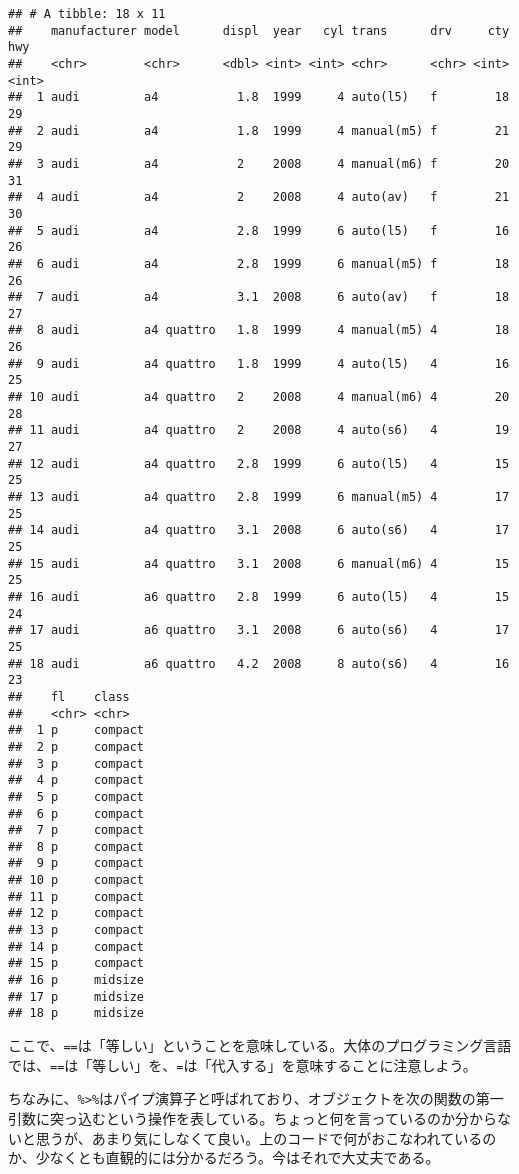 \documentclass[]{book}
\begin{document}
\begin{verbatim}
## # A tibble: 18 x 11
##    manufacturer model      displ  year   cyl trans      drv     cty   hwy
##    <chr>        <chr>      <dbl> <int> <int> <chr>      <chr> <int> <int>
##  1 audi         a4           1.8  1999     4 auto(l5)   f        18    29
##  2 audi         a4           1.8  1999     4 manual(m5) f        21    29
##  3 audi         a4           2    2008     4 manual(m6) f        20    31
##  4 audi         a4           2    2008     4 auto(av)   f        21    30
##  5 audi         a4           2.8  1999     6 auto(l5)   f        16    26
##  6 audi         a4           2.8  1999     6 manual(m5) f        18    26
##  7 audi         a4           3.1  2008     6 auto(av)   f        18    27
##  8 audi         a4 quattro   1.8  1999     4 manual(m5) 4        18    26
##  9 audi         a4 quattro   1.8  1999     4 auto(l5)   4        16    25
## 10 audi         a4 quattro   2    2008     4 manual(m6) 4        20    28
## 11 audi         a4 quattro   2    2008     4 auto(s6)   4        19    27
## 12 audi         a4 quattro   2.8  1999     6 auto(l5)   4        15    25
## 13 audi         a4 quattro   2.8  1999     6 manual(m5) 4        17    25
## 14 audi         a4 quattro   3.1  2008     6 auto(s6)   4        17    25
## 15 audi         a4 quattro   3.1  2008     6 manual(m6) 4        15    25
## 16 audi         a6 quattro   2.8  1999     6 auto(l5)   4        15    24
## 17 audi         a6 quattro   3.1  2008     6 auto(s6)   4        17    25
## 18 audi         a6 quattro   4.2  2008     8 auto(s6)   4        16    23
##    fl    class  
##    <chr> <chr>  
##  1 p     compact
##  2 p     compact
##  3 p     compact
##  4 p     compact
##  5 p     compact
##  6 p     compact
##  7 p     compact
##  8 p     compact
##  9 p     compact
## 10 p     compact
## 11 p     compact
## 12 p     compact
## 13 p     compact
## 14 p     compact
## 15 p     compact
## 16 p     midsize
## 17 p     midsize
## 18 p     midsize
\end{verbatim}

ここで、\texttt{==}は「等しい」ということを意味している。大体のプログラミング言語では、\texttt{==}は「等しい」を、\texttt{=}は「代入する」を意味することに注意しよう。

ちなみに、\texttt{\%\textgreater{}\%}はパイプ演算子と呼ばれており、オブジェクトを次の関数の第一引数に突っ込むという操作を表している。ちょっと何を言っているのか分からないと思うが、あまり気にしなくて良い。上のコードで何がおこなわれているのか、少なくとも直観的には分かるだろう。今はそれで大丈夫である。
\end{document}
